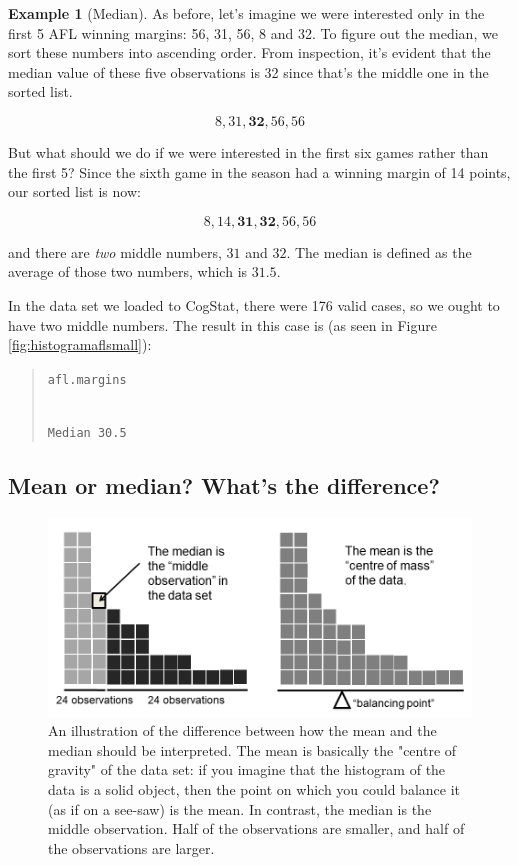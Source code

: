 \documentclass[
  11pt,
]{book}
\theoremstyle{definition}
\theoremstyle{definition}
\newtheorem{example}{Example}[chapter]
\theoremstyle{definition}
\theoremstyle{definition}
\theoremstyle{remark}
\begin{document}
\begin{example}[Median]
\protect\hypertarget{exm:exmedian}{}\label{exm:exmedian}As before, let's imagine we were interested only in the first 5 AFL winning margins: 56, 31, 56, 8 and 32. To figure out the median, we sort these numbers into ascending order. From inspection, it's evident that the median value of these five observations is 32 since that's the middle one in the sorted list.

\[
8, 31, \mathbf{32}, 56, 56
\]

But what should we do if we were interested in the first six games rather than the first 5? Since the sixth game in the season had a winning margin of 14 points, our sorted list is now:

\[
8, 14, \mathbf{31}, \mathbf{32}, 56, 56
\]

and there are \emph{two} middle numbers, \(31\) and \(32\). The median is defined as the average of those two numbers, which is \(31.5\).
\end{example}

In the data set we loaded to CogStat, there were 176 valid cases, so we ought to have two middle numbers. The result in this case is (as seen in Figure \ref{fig:histogramaflsmall}):

\begin{quote}
\texttt{afl.margins}\strut \\
\texttt{Median\ 30.5}
\end{quote}

\hypertarget{mean-or-median-whats-the-difference}{%
\subsection{Mean or median? What's the difference?}\label{mean-or-median-whats-the-difference}}

\begin{figure}

{\centering \includegraphics[width=0.66\linewidth]{./resources/image/meanmedian} 

}

\caption[An illustration of the difference between how the mean and the median should be interpreted.]{An illustration of the difference between how the mean and the median should be interpreted. The mean is basically the "centre of gravity" of the data set: if you imagine that the histogram of the data is a solid object, then the point on which you could balance it (as if on a see-saw) is the mean. In contrast, the median is the middle observation. Half of the observations are smaller, and half of the observations are larger.}\label{fig:meanmedian}
\end{figure}
\end{document}
